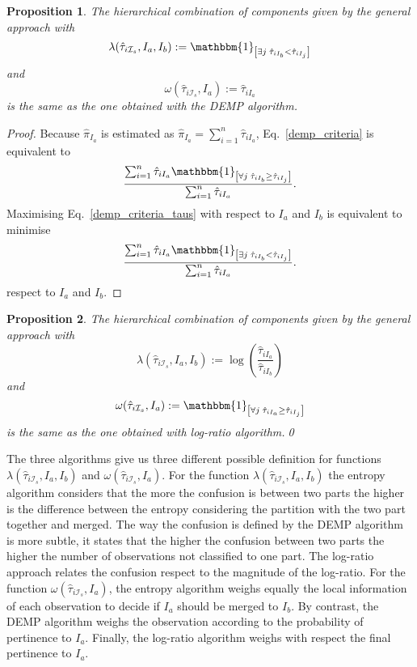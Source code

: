 \documentclass[10pt, a4paper]{article}
\newtheorem{prop}{Proposition}
\begin{document}
\begin{prop}
The hierarchical combination of components given by the general approach with
\[
\lambda(\hat{\tau}_{i \mathcal{I}_s}, I_a, I_b) := \mathbbm{1}_{\left[ \exists j\; \hat{\tau}_{i I_{b}} < \hat{\tau}_{iI_j} \right]}
\]
and
\[
\omega(\hat{\tau}_{i \mathcal{I}_s}, I_a) := \hat{\tau}_{iI_a}
\]
is the same as the one obtained with the DEMP algorithm.
\end{prop}
\begin{proof}
Because $\hat{\pi}_{I_a}$ is estimated as $\hat{\pi}_{I_a} = \sum_{i=1}^n \hat{\tau}_{iI_a}$, Eq.~\ref{demp_criteria} is equivalent to
\begin{equation}\label{demp_criteria_taus}
\frac{ \sum_{i=1}^n {\hat{\tau}_{iI_a} \mathbbm{1}_{\left[ \forall j\; \hat{\tau}_{i I_{b}} \geq \hat{\tau}_{iI_j} \right]}}}{  \sum_{i=1}^n \hat{\tau}_{iI_a}}.
\end{equation}
Maximising Eq.~\ref{demp_criteria_taus} with respect to $I_a$ and $I_b$ is equivalent to minimise
\[
\frac{ \sum_{i=1}^n {\hat{\tau}_{iI_a} \mathbbm{1}_{\left[ \exists j\; \hat{\tau}_{i I_{b}} < \hat{\tau}_{iI_j} \right]}}}{  \sum_{i=1}^n \hat{\tau}_{iI_a}}.
\]
respect to $I_a$ and $I_b$.
\end{proof}

\begin{prop}
The hierarchical combination of components given by the general approach with
\[
\lambda(\hat{\tau}_{i \mathcal{I}_s}, I_a, I_b) := \log( \frac{ \hat{\tau}_{iI_a} }{ \hat{\tau}_{iI_b} })
\]
and
\[
\omega(\hat{\tau}_{i \mathcal{I}_s}, I_a) := \mathbbm{1}_{\left[ \forall j\; \hat{\tau}_{i I_{a}} \geq \hat{\tau}_{iI_j} \right]}
\]
is the same as the one obtained with log-ratio algorithm.\qed
\end{prop}

The three algorithms give us three different possible definition for functions $\lambda(\hat{\tau}_{i \mathcal{I}_s}, I_a, I_b)$ and $\omega(\hat{\tau}_{i \mathcal{I}_s}, I_a)$. For the function $\lambda(\hat{\tau}_{i \mathcal{I}_s}, I_a, I_b)$ the entropy algorithm considers that the more the confusion is between two parts the higher is the difference between the entropy considering the partition with the two part together and merged. The way the confusion is defined by the DEMP algorithm is more subtle, it states that the higher the confusion between two parts the higher the number of observations not classified to one part. The log-ratio approach relates the confusion respect to the magnitude of the log-ratio. For the function $\omega(\hat{\tau}_{i \mathcal{I}_s}, I_a)$, the entropy algorithm weighs equally the local information of each observation to decide if $I_a$ should be merged to $I_b$. By contrast, the DEMP algorithm weighs the observation according to the probability of pertinence to $I_a$. Finally, the log-ratio algorithm weighs with respect the final pertinence to $I_a$.




{}
\end{document}
